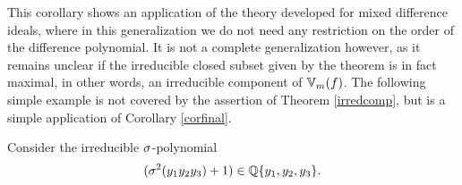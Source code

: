 This corollary shows an application of the theory developed for mixed difference ideals, where in this generalization we do not need any restriction on the order of the difference polynomial.
It is not a complete generalization however, as it remains unclear if the irreducible closed subset given by the theorem is in fact maximal, in other words, an irreducible component of $\mathbb{V}_m(f)$.
The following simple example is not covered by the assertion of Theorem \ref{irredcomp}, but is a simple application of Corollary \ref{corfinal}.

\begin{ex}
Consider the irreducible $\sigma$-polynomial $$(\sigma^2(y_1 y_2 y_3) + 1) \in \mathbb{Q}\{y_1,y_2,y_3\}.$$
\end{ex}


